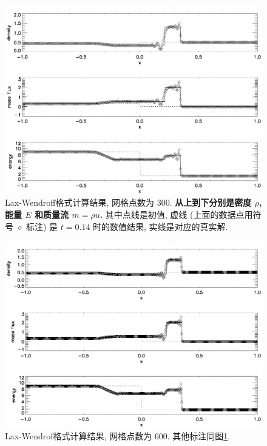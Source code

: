 \documentclass[10.5pt
]{article}
\begin{document}
\begin{figure}[htb]
\begin{center}
\includegraphics[width=.85\textwidth]{hw3_lax_300.eps}
\caption{Lax-Wendroff格式计算结果, 网格点数为 300. \textbf{从上到下分别是密度 $\rho$, 能量 $E$ 和质量流 $m = \rho u$.}
其中点线是初值, 虚线 (上面的数据点用符号 $\diamond$ 标注) 是 $t=0.14$ 时的数值结果, 实线是对应的真实解.}\label{Fig:LaxA}
\end{center}
\end{figure}

\begin{figure}[htb]
\begin{center}
\includegraphics[width=.85\textwidth]{hw3_lax_600.eps}
\caption{Lax-Wendrof格式计算结果, 网格点数为 600. 
其他标注同图\ref{Fig:LaxA}.}\label{Fig:LaxB}
\end{center}
\end{figure}
\end{document}
